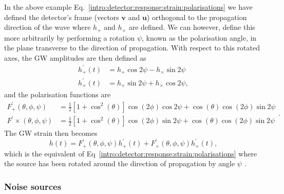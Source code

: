 In the above example Eq.~\ref{intro:detector:response:strain:polarisations} we
have defined the detector's frame (vectors $\bm{v}$ and $\bm{u}$) orthogonal to the propagation direction of the wave where $h_{+}$ and $h_{\times}$ are defined. 
We can however, define this more arbitrarily by performing a rotation $\psi$, known as the polarisation angle, in the plane transverse to the direction of propagation. 
With respect to this rotated axes, the \gls{GW} amplitudes are then defined as
\begin{equation}
	\begin{split}
		h^{\prime}_{+}(t) &= h_{+}\cos{2\psi} - h_{\times}\sin{2\psi} \\
		h^{\prime}_{\times}(t) &= h_{+}\sin{2\psi} + h_{\times}\cos{2\psi},
	\end{split}
\end{equation}
and the polarisation functions are
\begin{equation}
\label{intro:detector:polarisationfuncs}
\begin{split}
F^{\prime}_{+}(\theta,\phi,\psi) &= \frac{1}{2} \left[ 1 + \cos^2 \left(\theta\right) \right] \cos\left(2\phi\right) \cos{2\psi} + \cos \left(\theta\right) \cos \left(2\phi \right) \sin{2\psi} \\
F^{\prime}{\times}(\theta,\phi,\psi) &= \frac{1}{2} \left[ 1 + \cos^2 \left(\theta\right) \right] \cos\left(2\phi\right) \sin{2\psi} + \cos \left(\theta\right) \cos \left(2\phi \right) \sin{2\psi}
\end{split}.
\end{equation}
The \gls{GW} strain then becomes
\begin{equation}
	\label{intro:detector:strain_2}
	h(t) = F^{\prime}_{+}(\theta,\phi, \psi)h^{\prime}_{+}(t) + F^{\prime}_{\times}(\theta,\phi,\psi)h^{\prime}_{\times}(t),
\end{equation}
which is the equivalent of Eq~\ref{intro:detector:response:strain:polarisations} where the source has been rotated around the direction of propagation by angle $\psi$ \citep{maggioreGravitationalWaves}.


\subsubsection{\label{intro:detector:noise}Noise sources}

